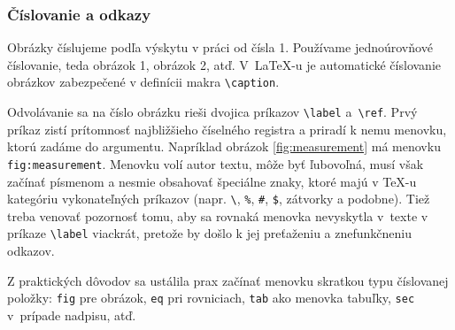 \documentclass[../../../thesis.tex]{subfiles}
\begin{document}
\subsubsection{Číslovanie a odkazy}
Obrázky číslujeme podľa výskytu v práci od čísla 1.
Používame jednoúrovňové číslovanie,
teda obrázok 1, obrázok 2, atď.
V~\LaTeX-u je automatické číslovanie obrázkov zabezpečené v definícii makra \verb|\caption|.

Odvolávanie sa na číslo obrázku rieši dvojica príkazov \verb|\label| a~\verb|\ref|.
Prvý príkaz zistí prítomnosť najbližšieho číselného
registra a priradí k nemu menovku, ktorú zadáme do argumentu.
Napríklad obrázok \ref{fig:measurement} má menovku \verb|fig:measurement|. Menovku volí autor textu, môže byť ľubovoľná, musí však začínať písmenom a nesmie obsahovať špeciálne znaky, ktoré majú v \TeX-u kategóriu vykonateľných príkazov (napr. \verb|\|, \verb|%|, \verb|#|, \verb|$|, zátvorky a podobne). Tiež treba venovať pozornosť tomu, aby sa rovnaká menovka nevyskytla v~texte v príkaze \verb|\label| viackrát, pretože by došlo k jej preťaženiu a znefunkčneniu odkazov.

Z praktických dôvodov sa ustálila prax začínať menovku skratkou typu číslovanej položky: \verb|fig| pre obrázok, \verb|eq| pri rovniciach, \verb|tab| ako menovka tabuľky, \verb|sec| v~prípade nadpisu, atď.
\end{document}
